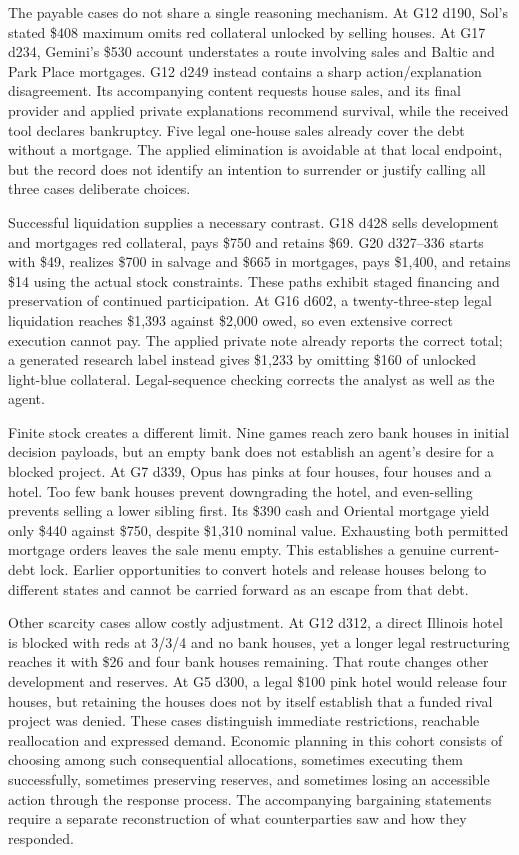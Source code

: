 The payable cases do not share a single reasoning mechanism. At G12 d190, Sol's stated \$408 maximum omits red collateral unlocked by selling houses. At G17 d234, Gemini's \$530 account understates a route involving sales and Baltic and Park Place mortgages. G12 d249 instead contains a sharp action/explanation disagreement. Its accompanying content requests house sales, and its final provider and applied private explanations recommend survival, while the received tool declares bankruptcy. Five legal one-house sales already cover the debt without a mortgage. The applied elimination is avoidable at that local endpoint, but the record does not identify an intention to surrender or justify calling all three cases deliberate choices.

Successful liquidation supplies a necessary contrast. G18 d428 sells development and mortgages red collateral, pays \$750 and retains \$69. G20 d327--336 starts with \$49, realizes \$700 in salvage and \$665 in mortgages, pays \$1,400, and retains \$14 using the actual stock constraints. These paths exhibit staged financing and preservation of continued participation. At G16 d602, a twenty-three-step legal liquidation reaches \$1,393 against \$2,000 owed, so even extensive correct execution cannot pay. The applied private note already reports the correct total; a generated research label instead gives \$1,233 by omitting \$160 of unlocked light-blue collateral. Legal-sequence checking corrects the analyst as well as the agent.

Finite stock creates a different limit. Nine games reach zero bank houses in initial decision payloads, but an empty bank does not establish an agent's desire for a blocked project. At G7 d339, Opus has pinks at four houses, four houses and a hotel. Too few bank houses prevent downgrading the hotel, and even-selling prevents selling a lower sibling first. Its \$390 cash and Oriental mortgage yield only \$440 against \$750, despite \$1,310 nominal value. Exhausting both permitted mortgage orders leaves the sale menu empty. This establishes a genuine current-debt lock. Earlier opportunities to convert hotels and release houses belong to different states and cannot be carried forward as an escape from that debt.

Other scarcity cases allow costly adjustment. At G12 d312, a direct Illinois hotel is blocked with reds at 3/3/4 and no bank houses, yet a longer legal restructuring reaches it with \$26 and four bank houses remaining. That route changes other development and reserves. At G5 d300, a legal \$100 pink hotel would release four houses, but retaining the houses does not by itself establish that a funded rival project was denied. These cases distinguish immediate restrictions, reachable reallocation and expressed demand. Economic planning in this cohort consists of choosing among such consequential allocations, sometimes executing them successfully, sometimes preserving reserves, and sometimes losing an accessible action through the response process. The accompanying bargaining statements require a separate reconstruction of what counterparties saw and how they responded.
